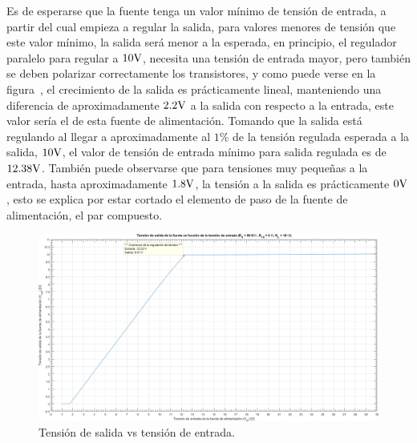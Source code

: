 \vspace{1.5cm}

Es de esperarse que la fuente tenga un valor mínimo de tensión de entrada, a partir del cual empieza a regular la salida, para valores menores de tensión que este valor mínimo, la salida será menor a la esperada, en principio, el regulador paralelo para regular a $10 \si[per-mode=symbol]{\volt}$, necesita una tensión de entrada mayor, pero también se deben polarizar correctamente los transistores, y como puede verse en la figura~, el crecimiento de la salida es prácticamente lineal, manteniendo una diferencia de aproximadamente $2.2 \si[per-mode=symbol]{\volt}$ a la salida con respecto a la entrada, este valor sería el  de esta fuente de alimentación. Tomando que la salida está regulando al 
llegar a aproximadamente al $1 \%$ de la tensión regulada esperada a la salida, $10 \si[per-mode=symbol]{\volt}$, el valor de tensión de entrada mínimo para salida regulada es de $12.38 \si[per-mode=symbol]{\volt}$. También puede observarse que para tensiones muy pequeñas a la entrada, hasta aproximadamente $1.8 \si[per-mode=symbol]{\volt}$, la tensión a la salida es prácticamente $0 \si[per-mode=symbol]{\volt}$, esto se explica por estar cortado el elemento de paso de la fuente de alimentación, el par compuesto.

\vfill

\clearpage

\begin{figure}[H] %
\begin{center}
\includegraphics[width=1.2 \textwidth, angle=90]{./img/preguntas/p18.png}
\caption{\label{fig:fig_p18_vo_vs_vi}\footnotesize{Tensión de salida vs tensión de entrada.}}
\end{center}
\end{figure}

\clearpage